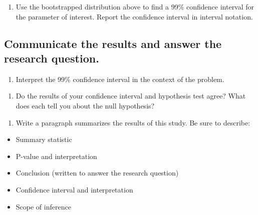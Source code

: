 \documentclass[
]{report}
\providecommand{\tightlist}{%
  \setlength{\itemsep}{0pt}\setlength{\parskip}{0pt}}
\begin{document}
\begin{enumerate}
\def\labelenumi{\arabic{enumi}.}
\setcounter{enumi}{18}
\tightlist
\item
  Use the bootstrapped distribution above to find a 99\% confidence interval for the parameter of interest. Report the confidence interval in interval notation.
\end{enumerate}

\vspace{.3in}

\hypertarget{communicate-the-results-and-answer-the-research-question.}{%
\subsection*{Communicate the results and answer the research question.}\label{communicate-the-results-and-answer-the-research-question.}}

\begin{enumerate}
\def\labelenumi{\arabic{enumi}.}
\setcounter{enumi}{19}
\tightlist
\item
  Interpret the 99\% confidence interval in the context of the problem.
\end{enumerate}

\vspace{.8in}

\newpage

\begin{enumerate}
\def\labelenumi{\arabic{enumi}.}
\setcounter{enumi}{20}
\tightlist
\item
  Do the results of your confidence interval and hypothesis test agree? What does each tell you about the null hypothesis?
\end{enumerate}

\vspace{.7in}

\begin{enumerate}
\def\labelenumi{\arabic{enumi}.}
\setcounter{enumi}{21}
\tightlist
\item
  Write a paragraph summarizes the results of this study. Be sure to describe:
\end{enumerate}

\begin{itemize}
\item
  Summary statistic
\item
  P-value and interpretation
\item
  Conclusion (written to answer the research question)
\item
  Confidence interval and interpretation
\item
  Scope of inference
\end{itemize}
\end{document}

